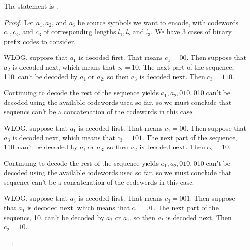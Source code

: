 \documentclass[
  coursecode={MTHE 474},
  assignmentname={Homework \homeworknumber},
  studentnumber=20053722,
  name={Bryan Hoang},
  draft,
]{
  ltxanswer%
}
\begin{document}
  \begin{questions}
    \setcounter{question}{\questionnumber}
    \addtocounter{question}{-1}
    \question[15]\
    \begin{parts}
      \part{}
      \begin{solution}
        \begin{claim}
          The statement is .
        \end{claim}
        \begin{proof}
          Let \(a_{1},a_{2}\), and \(a_{3}\) be source symbols we want to encode, with codewords \(c_{1},c_{2}\), and \(c_{3}\) of corresponding lengths \(l_{1},l_{2}\) and \(l_{3}\). We have 3 cases of binary prefix codes to consider.
          \begin{proofcase}
            WLOG, suppose that \(a_{1}\) is decoded first. That means \(c_{1}=00\). Then suppose that \(a_{2}\) is decoded next, which means that \(c_{2}=10\). The next part of the sequence, 110, can't be decoded by \(a_{1}\) or \(a_{2}\), so then \(a_{3}\) is decoded next. Then \(c_{3}=110\).

            Continuing to decode the rest of the sequence yields \(a_{1},a_{2},010\). 010 can't be decoded using the available codewords used so far, so we must conclude that sequence can't be a concatenation of the codewords in this case.
          \end{proofcase}
          \begin{proofcase}
            WLOG, suppose that \(a_{1}\) is decoded first. That means \(c_{1}=00\). Then suppose that \(a_{3}\) is decoded next, which means that \(c_{3}=101\). The next part of the sequence, 110, can't be decoded by \(a_{1}\) or \(a_{3}\), so then \(a_{2}\) is decoded next. Then \(c_{2}=10\).

            Continuing to decode the rest of the sequence yields \(a_{1},a_{2},010\). 010 can't be decoded using the available codewords used so far, so we must conclude that sequence can't be a concatenation of the codewords in this case.
          \end{proofcase}
          \begin{proofcase}
            WLOG, suppose that \(a_{3}\) is decoded first. That means \(c_{3}=001\). Then suppose that \(a_{1}\) is decoded next, which means that \(c_{1}=01\). The next part of the sequence, 10, can't be decoded by \(a_{3}\) or \(a_{1}\), so then \(a_{2}\) is decoded next. Then \(c_{2}=10\).


\end{proofcase}
\end{proof}
\end{solution}
\end{parts}
\end{questions}
\end{document}
